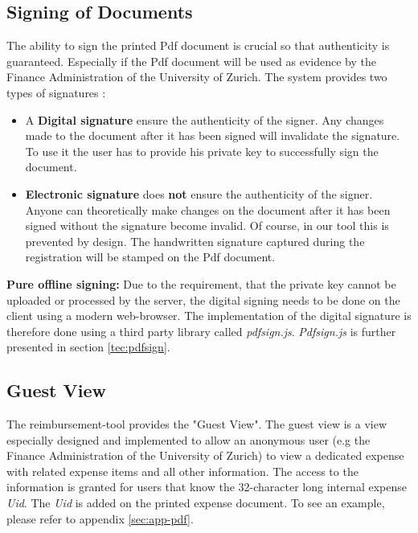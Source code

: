 \subsection{Signing of Documents}
The ability to sign the printed Pdf document is crucial so that authenticity is guaranteed. Especially if the Pdf document will be used as evidence by the Finance Administration of the University of Zurich. The system provides two types of signatures \cite{arx-signature}:
\begin{itemize}
	\item A \textbf{Digital signature} ensure the authenticity of the signer. Any changes made to the document after it has been signed will invalidate the signature. To use it the user has to provide his private key to successfully sign the document.
	\item \textbf{Electronic signature} does \textbf{not} ensure the authenticity of the signer. Anyone can theoretically make changes on the document after it has been signed without the signature become invalid. Of course, in our tool this is prevented by design. The handwritten signature captured during the registration will be stamped on the Pdf document.
\end{itemize}\par

\textbf{Pure offline signing: }Due to the requirement, that the private key cannot be uploaded or processed by the server, the digital signing needs to be done on the client using a modern web-browser. The implementation of the digital signature is therefore done using a third party library called \textit{pdfsign.js}\cite{pdfsign}. \textit{Pdfsign.js}  is further presented in section \ref{tec:pdfsign}.\par

\subsection{Guest View}
The reimbursement-tool provides the "Guest View". The guest view is a view especially designed and implemented to allow an anonymous user (e.g the Finance Administration of the University of Zurich) to view a dedicated expense with related expense items and all other information. The access to the information is granted for users that know the 32-character long internal expense \textit{Uid}. The \textit{Uid} is added on the printed expense document. To see an example, please refer to appendix \ref{sec:app-pdf}.\par 

